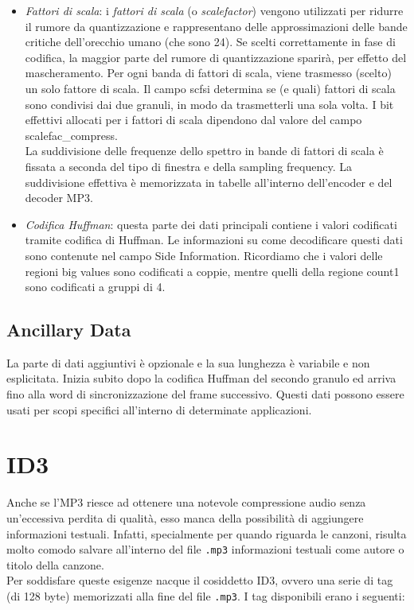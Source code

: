 			\begin{itemize}
				\item \textit{Fattori di scala}: i \textit{fattori di scala} (o \textit{scalefactor}) vengono utilizzati per ridurre il rumore da quantizzazione e rappresentano delle approssimazioni delle bande critiche dell'orecchio umano (che sono 24). Se scelti correttamente in fase di codifica, la maggior parte del rumore di quantizzazione sparirà, per effetto del mascheramento. Per ogni banda di fattori di scala, viene trasmesso (scelto) un solo fattore di scala. Il campo scfsi determina se (e quali) fattori di scala sono condivisi dai due granuli, in modo da trasmetterli una sola volta. I bit effettivi allocati per i fattori di scala dipendono dal valore del campo scalefac\_compress.\\
					La suddivisione delle frequenze dello spettro in bande di fattori di scala è fissata a seconda del tipo di finestra e della sampling frequency. La suddivisione effettiva è memorizzata in tabelle all'interno dell'encoder e del decoder MP3.
				
				\item \textit{Codifica Huffman}: questa parte dei dati principali contiene i valori codificati tramite codifica di Huffman. Le informazioni su come decodificare questi dati sono contenute nel campo Side Information. Ricordiamo che i valori delle regioni big values sono codificati a coppie, mentre quelli della regione count1 sono codificati a gruppi di 4.
				
			\end{itemize}
		
		\subsection{Ancillary Data} \label{subsec:ancillary_data}
			
			La parte di dati aggiuntivi è opzionale e la sua lunghezza è variabile e non esplicitata. Inizia subito dopo la codifica Huffman del secondo granulo ed arriva fino alla word di sincronizzazione del frame successivo. Questi dati possono essere usati per scopi specifici all'interno di determinate applicazioni.
		
	\section{ID3} \label{sec:id3}
		
		Anche se l'MP3 riesce ad ottenere una notevole compressione audio senza un'eccessiva perdita di qualità, esso manca della possibilità di aggiungere informazioni testuali. Infatti, specialmente per quando riguarda le canzoni, risulta molto comodo salvare all'interno del file \texttt{.mp3}  informazioni testuali come autore o titolo della canzone.\\
		Per soddisfare queste esigenze nacque il cosiddetto ID3, ovvero una serie di tag (di 128 byte) memorizzati alla fine del file \texttt{.mp3}. I tag disponibili erano i seguenti:
		
